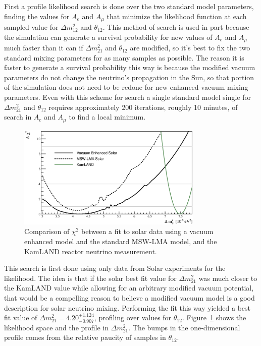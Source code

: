 \begin{appendices}
First a profile likelihood search is done over the two standard model parameters,
finding the values for $A_{e}$ and $A_{\mu}$ that minimize the likelihood
function at each sampled value for $\Delta m^{2}_{12}$ and $\theta_{12}$.
This method of search is used in part because the simulation can generate
a survival probability for new values of $A_{e}$ and $A_{\mu}$ much
faster than it can if $\Delta m^{2}_{21}$ and $\theta_{12}$ are modified,
so it's best to fix the two standard mixing parameters for as many samples
as possible.
The reason it is faster to generate a survival probability this way is because
the modified vacuum parameters do not
change the neutrino's propagation in the Sun, so that portion of the simulation
does not need to be redone for new enhanced vacuum mixing parameters.
Even with this scheme for search a single standard model single for $\Delta m^{2}_{21}$ and
$\theta_{12}$ requires approximately 200 iterations, roughly 10 minutes, of search in $A_{e}$ and
$A_{\mu}$ to find a local minimum.

\begin{figure}[htbp]
\centering
\includegraphics[width=0.79\textwidth]{dm21_compare}
\caption[Modified Vacuum Mixing $\chi^{2}$ Profile]{
Comparison of $\chi^{2}$ between a fit to solar data
using a vacuum enhanced model and the standard MSW-LMA
model, and the KamLAND reactor neutrino measurement.}
\label{fig:chi2_comparison}
\end{figure}

This search is first done using only data from Solar experiments for the
likelihood.
The idea is that if the solar best fit value for $\Delta m^{2}_{21}$ was much closer
to the KamLAND value while allowing for an arbitrary modified vacuum potential,
that would be a compelling reason to believe a modified vacuum model is a
good description for solar neutrino mixing.
Performing the fit this way yielded a best fit value
of $\Delta m^{2}_{21}=4.20^{+1.124}_{-0.907}$, profiling over values for $\theta_{12}$.
Figure~\ref{fig:chi2_comparison} shows the likelihood space and the profile in $\Delta m^{2}_{21}$.
The bumps in the one-dimensional profile comes from the relative paucity
of samples in $\theta_{12}$.


\end{appendices}
